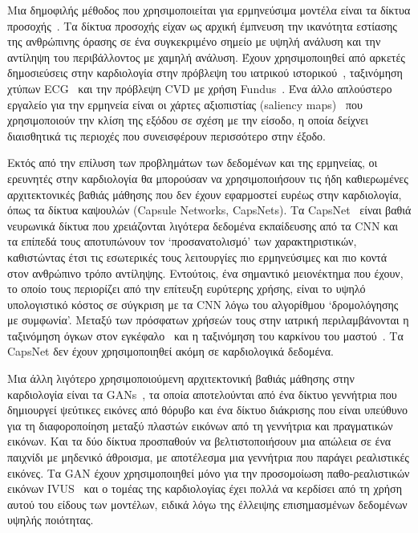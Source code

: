 Μια δημοφιλής μέθοδος που χρησιμοποιείται για ερμηνεύσιμα μοντέλα είναι τα δίκτυα προσοχής~\cite{bahdanau2014neural}.
Τα δίκτυα προσοχής είχαν ως αρχική έμπνευση την ικανότητα εστίασης της ανθρώπινης όρασης σε ένα συγκεκριμένο σημείο με υψηλή ανάλυση και την αντίληψη του περιβάλλοντος με χαμηλή ανάλυση.
Έχουν χρησιμοποιηθεί από αρκετές δημοσιεύσεις στην καρδιολογία στην πρόβλεψη του ιατρικού ιστορικού~\cite{kim2017highrisk}, ταξινόμηση χτύπων ECG~\cite{schwab2017beat} και την πρόβλεψη CVD με χρήση Fundus~\cite{poplin2017predicting}.
Ένα άλλο απλούστερο εργαλείο για την ερμηνεία είναι οι χάρτες αξιοπιστίας (saliency maps)~\cite{simonyan2013deep} που χρησιμοποιούν την κλίση της εξόδου σε σχέση με την είσοδο, η οποία δείχνει διαισθητικά τις περιοχές που συνεισφέρουν περισσότερο στην έξοδο.

Εκτός από την επίλυση των προβλημάτων των δεδομένων και της ερμηνείας, οι ερευνητές στην καρδιολογία θα μπορούσαν να χρησιμοποιήσουν τις ήδη καθιερωμένες αρχιτεκτονικές βαθιάς μάθησης που δεν έχουν εφαρμοστεί ευρέως στην καρδιολογία, όπως τα δίκτυα καψουλών (Capsule Networks, CapsNets).
Τα CapsNet~\cite{sabour2017dynamic} είναι βαθιά νευρωνικά δίκτυα που χρειάζονται λιγότερα δεδομένα εκπαίδευσης από τα CNN και τα επίπεδά τους αποτυπώνουν τον `προσανατολισμό' των χαρακτηριστικών, καθιστώντας έτσι τις εσωτερικές τους λειτουργίες πιο ερμηνεύσιμες και πιο κοντά στον ανθρώπινο τρόπο αντίληψης.
Εντούτοις, ένα σημαντικό μειονέκτημα που έχουν, το οποίο τους περιορίζει από την επίτευξη ευρύτερης χρήσης, είναι το υψηλό υπολογιστικό κόστος σε σύγκριση με τα CNN λόγω του αλγορίθμου `δρομολόγησης με συμφωνία'.
Μεταξύ των πρόσφατων χρήσεών τους στην ιατρική περιλαμβάνονται η ταξινόμηση όγκων στον εγκέφαλο~\cite{afshar2018brain} και η ταξινόμηση του καρκίνου του μαστού~\cite{iesmantas2018convolutional}.
Τα CapsNet δεν έχουν χρησιμοποιηθεί ακόμη σε καρδιολογικά δεδομένα.

Μια άλλη λιγότερο χρησιμοποιούμενη αρχιτεκτονική βαθιάς μάθησης στην καρδιολογία είναι τα GANs~\cite{goodfellow2014generative}, τα οποία αποτελούνται από ένα δίκτυο γεννήτρια που δημιουργεί ψεύτικες εικόνες από θόρυβο και ένα δίκτυο διάκρισης που είναι υπεύθυνο για τη διαφοροποίηση μεταξύ πλαστών εικόνων από τη γεννήτρια και πραγματικών εικόνων.
Και τα δύο δίκτυα προσπαθούν να βελτιστοποιήσουν μια απώλεια σε ένα παιχνίδι με μηδενικό άθροισμα, με αποτέλεσμα μια γεννήτρια που παράγει ρεαλιστικές εικόνες.
Τα GAN έχουν χρησιμοποιηθεί μόνο για την προσομοίωση παθο-ρεαλιστικών εικόνων IVUS~\cite{tom2018simulating} και ο τομέας της καρδιολογίας έχει πολλά να κερδίσει από τη χρήση αυτού του είδους των μοντέλων, ειδικά λόγω της έλλειψης επισημασμένων δεδομένων υψηλής ποιότητας.

